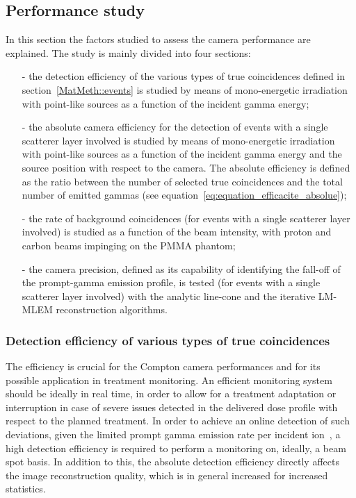 \subsection{Performance study}
\label{MatMeth:performance}
In this section the factors studied to assess the camera performance are explained. The study is mainly divided into four sections:
\begin{itemize}
\item[-] the detection efficiency of the various types of true coincidences defined in section~\ref{MatMeth::events} is studied by means of mono-energetic irradiation with point-like sources as a function of the incident gamma energy;
\item[-] the absolute camera efficiency for the detection of events with a single scatterer layer involved is studied by means of mono-energetic irradiation with point-like sources as a function of the incident gamma energy and the source position with respect to the camera. The absolute efficiency is defined as the ratio between the number of selected true coincidences and the total number of emitted gammas (see equation~\ref{eq:equation_efficacite_absolue}); 
\item[-] the rate of background coincidences (for events with a single scatterer layer involved) is studied as a function of the beam intensity, with proton and carbon beams impinging on the PMMA phantom;
\item[-] the camera precision, defined as its capability of identifying the fall-off of the prompt-gamma emission profile, is tested (for events with a single scatterer layer involved) with the analytic line-cone and the iterative LM-MLEM reconstruction algorithms. 
\end{itemize}

\subsubsection{Detection efficiency of various types of true coincidences}\label{relEff}
The efficiency is crucial for the Compton camera performances and for its possible application in treatment monitoring. An efficient monitoring system should be ideally in real time, in order to allow for a treatment adaptation or interruption in case of severe issues detected in the delivered dose profile with respect to the planned treatment. In order to achieve an online detection of such deviations, given the limited prompt gamma emission rate per incident ion~\cite{Ortega:2015aa}, a high detection efficiency is required to perform a monitoring on, ideally, a beam spot basis. In addition to this, the absolute detection efficiency directly affects the image reconstruction quality, which is in general increased for increased statistics.

